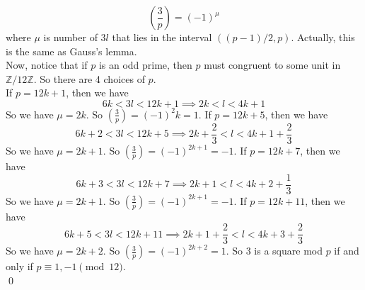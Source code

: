\documentclass[12pt]{amsart}
\newcommand{\Z}{\mathbb{Z}}
\begin{document}
\[(\frac{3}{p})=(-1)^\mu\]
where $\mu$ is number of $3l$ that lies in the interval $((p-1)/2,p)$. Actually, this is the same as Gauss's lemma.\\
Now, notice that if $p$ is an odd prime, then $p$ must congruent to some unit in $\Z/12\Z$. So there are 4 choices of $p$.\\
If $p=12k+1$, then we have 
\[6k<3l<12k+1\implies 2k<l<4k+1\]
So we have $\mu=2k$. So $(\frac{3}{p})=(-1)^2k=1$.
If $p=12k+5$, then we have 
\[6k+2<3l<12k+5\implies 2k+\frac{2}{3}<l<4k+1+\frac{2}{3}\]
So we have $\mu=2k+1$. So $(\frac{3}{p})=(-1)^{2k+1}=-1$.
If $p=12k+7$, then we have 
\[6k+3<3l<12k+7\implies 2k+1<l<4k+2+\frac{1}{3}\]
So we have $\mu=2k+1$. So $(\frac{3}{p})=(-1)^{2k+1}=-1$.
If $p=12k+11$, then we have 
\[6k+5<3l<12k+11\implies 2k+1+\frac{2}{3}<l<4k+3+\frac{2}{3}\]
So we have $\mu=2k+2$. So $(\frac{3}{p})=(-1)^{2k+2}=1$.
So $3$ is a square mod $p$ if and only if $p\equiv 1,-1\pmod{12}$.\\
\qed\\
\end{document}
